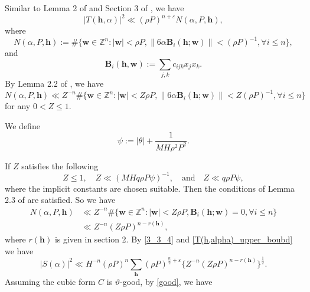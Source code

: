 \documentclass[12pt]{amsart}
\theoremstyle{definition}
\numberwithin{equation}{section}
\begin{document}
Similar to Lemma 2 of \cite{browning2009least} and Section 3 of \cite{heath2007cubic}, we have 
\begin{equation}
    \label{T(h,alpha)_upper_boubd}
    |T(\boldsymbol{h},\alpha)|^2 \ll (\rho P)^{n+\varepsilon}N(\alpha,P,\boldsymbol{h}),
\end{equation}
where
\begin{equation}
    \label{N(alpha,P,h)_definition}
    N(\alpha,P,\boldsymbol{h}):=\#\{\boldsymbol{w}\in \mathbb{Z}^{n}:|\boldsymbol{w}|<\rho P,\left\|6\alpha\boldsymbol{B}_i(\boldsymbol{h};\boldsymbol{w})\right\| < (\rho P)^{-1} , \forall i \leq n\},
\end{equation}
and
\begin{equation}
    \label{Bi(h,w)_definition}
    \boldsymbol{B}_i(\boldsymbol{h},\boldsymbol{w}):=\sum_{j,k}c_{ijk}x_jx_k.
\end{equation}
By Lemma 2.2 of \cite{heath2007cubic}, we have
\begin{equation}
    \label{N(alpha,P,h)_upper_bound}
    N(\alpha,P,\boldsymbol{h})\ll Z^{-n}\#\{\boldsymbol{w}\in \mathbb{Z}^{n}:|\boldsymbol{w}|<Z\rho P,\left\|6\alpha\boldsymbol{B}_i(\boldsymbol{h};\boldsymbol{w})\right\| < Z(\rho P)^{-1}, \forall i \leq n\}
\end{equation}
for any $0<Z \leq 1.$

We define
\begin{equation}
    \label{psi_definition}
    \psi := |\theta|+\frac{1}{MH\rho^2P^2}.
\end{equation}

If $Z$ satisfies the following
\begin{equation}
    \label{Z_restriction}
    Z \leq 1,\quad Z \ll (MHq\rho P \psi)^{-1}, \quad\text{and}\quad Z \ll q\rho P \psi,
\end{equation}
where the implicit constants are chosen suitable. Then the conditions of Lemma 2.3 of \cite{heath2007cubic} are satisfied. So we have
\begin{equation*}
    \begin{split}
        N(\alpha,P,\boldsymbol{h})
        &\ll Z^{-n}\#\{\boldsymbol{w}\in \mathbb{Z}^{n}:|\boldsymbol{w}|<Z\rho P, \boldsymbol{B}_i(\boldsymbol{h};\boldsymbol{w}) =0,  \forall i \leq n\}\\
        &\ll Z^{-n}(Z\rho P)^{n-r(\boldsymbol{h})},
    \end{split}
\end{equation*}
where $r(\boldsymbol{h})$ is given in section 2. By \eqref{3_3_4} and \eqref{T(h,alpha)_upper_boubd} we have
\begin{equation*}
    \left|S(\alpha)\right|^2 \ll H^{-n}(\rho P)^n\sum_{\boldsymbol{h}}(\rho P)^{\frac{n}{2}+\varepsilon}\{Z^{-n}(Z\rho P)^{n-r(\boldsymbol{h})}\}^{\frac{1}{2}}.
\end{equation*}
Assuming the cubic form $C$ is $\vartheta$-good, by \eqref{good}, we have
\end{document}
